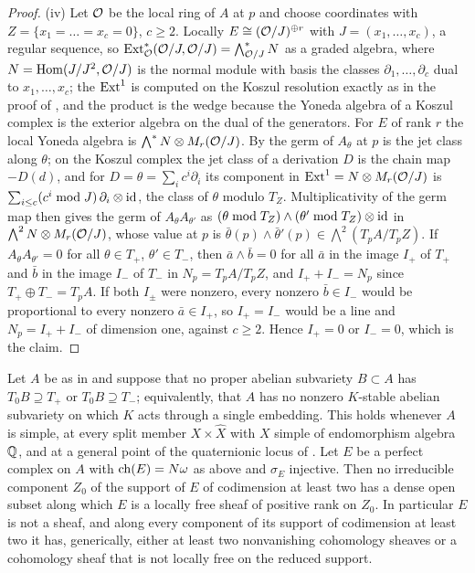\begin{proof}
(iv) Let $\mathcal{O}$ be the local ring of $A$ at $p$ and choose coordinates with
$Z=\{x_{1}=\dots=x_{c}=0\}$, $c\ge2$. Locally $E\cong(\mathcal{O}/J)^{\oplus r}$
with $J=(x_{1},\dots,x_{c})$, a regular sequence, so
$\operatorname{Ext}^{*}_{\mathcal{O}}(\mathcal{O}/J,\mathcal{O}/J)=\bigwedge^{*}_{\mathcal{O}/J}N$ as a graded algebra,
where $N=\operatorname{Hom}(J/J^{2},\mathcal{O}/J)$ is the normal module with basis the classes
$\partial_{1},\dots,\partial_{c}$ dual to $x_{1},\dots,x_{c}$; the
$\operatorname{Ext}^{1}$ is computed on the Koszul resolution exactly as in the proof of
, and the product is the wedge because the Yoneda
algebra of a Koszul complex is the exterior algebra on the dual of the
generators. For $E$ of rank $r$ the local Yoneda algebra is
$\bigwedge^{*}N\otimes M_{r}(\mathcal{O}/J)$. By  the germ of
$A_{\theta}$ at $p$ is the jet class along $\theta$; on the Koszul complex the
jet class of a derivation $D$ is the chain map $-D(d)$, and for
$D=\theta=\sum_{i}c^{i}\partial_{i}$ its component in $\operatorname{Ext}^{1}=N\otimes M_{r}(\mathcal{O}/J)$
is $\sum_{i\le c}(c^{i}\bmod J)\,\partial_{i}\otimes\operatorname{id}$, the class of
$\theta$ modulo $T_{Z}$. Multiplicativity of the germ map then gives the germ
of $A_{\theta}A_{\theta'}$ as
$(\theta\bmod T_{Z})\wedge(\theta'\bmod T_{Z})\otimes\operatorname{id}$ in
$\bigwedge^{2}N\otimes M_{r}(\mathcal{O}/J)$, whose value at $p$ is
$\bar\theta(p)\wedge\bar\theta'(p)\in\bigwedge^{2}(T_{p}A/T_{p}Z)$. If
$A_{\theta}A_{\theta'}=0$ for all $\theta\in T_{+}$, $\theta'\in T_{-}$,
then $\bar a\wedge\bar b=0$ for all $\bar a$ in the image $I_{+}$ of $T_{+}$
and $\bar b$ in the image $I_{-}$ of $T_{-}$ in $N_{p}=T_{p}A/T_{p}Z$, and
$I_{+}+I_{-}=N_{p}$ since $T_{+}\oplus T_{-}=T_{p}A$. If both $I_{\pm}$ were
nonzero, every nonzero $\bar b\in I_{-}$ would be proportional to every
nonzero $\bar a\in I_{+}$, so $I_{+}=I_{-}$ would be a line and
$N_{p}=I_{+}+I_{-}$ of dimension one, against $c\ge2$. Hence $I_{+}=0$ or
$I_{-}=0$, which is the claim.
\end{proof}

\begin{corollary}\label{cor:p2shape}
Let $A$ be as in  and suppose that no proper abelian
subvariety $B\subset A$ has $T_{0}B\supseteq T_{+}$ or $T_{0}B\supseteq T_{-}$;
equivalently, that $A$ has no nonzero $K$-stable abelian subvariety on which
$K$ acts through a single embedding. This holds whenever $A$ is simple, at
every split member $X\times\widehat X$ with $X$ simple of endomorphism
algebra $\mathbb{Q}$, and at a general point of the quaternionic locus of
\cite[Setup~15.24]{paperI}.
Let $E$ be a perfect complex on $A$ with $\operatorname{ch}(E)=N\omega$ as above and
$\sigma_{E}$ injective. Then no irreducible component $Z_{0}$ of the support
of $E$ of codimension at least two has a dense open subset along which $E$ is
a locally free sheaf of positive rank on $Z_{0}$. In particular $E$ is not a
sheaf, and along every component of its support of codimension at least two
it has, generically, either at least two nonvanishing cohomology sheaves or a
cohomology sheaf that is not locally free on the reduced support.
\end{corollary}

